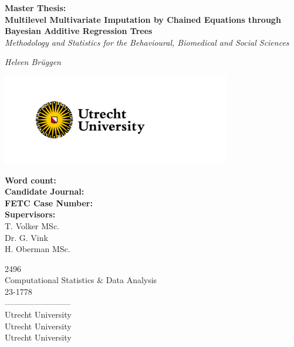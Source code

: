 \documentclass[10pt, a4paper, titlepage]{article}
\begin{document}
\begin{titlingpage}
\begin{center}
\Huge\textbf{Master Thesis:  \\ Multilevel Multivariate Imputation by Chained Equations through Bayesian Additive Regression Trees} \\
\Large\textit{Methodology and Statistics for the Behavioural, Biomedical and Social Sciences}

\vspace{.5cm}

\normalsize\textit{Heleen Brüggen}

\vspace{11.5cm}

\begin{minipage}{.5\textwidth}
\begin{center}
        \includegraphics[width=10cm]{graphs/UU_logo_2021_EN_RGB.png}
\end{center}
\end{minipage}%

\vspace{.25cm}

\begin{minipage}{0.5\textwidth}
\begin{flushleft}

\textbf{Word count:} \\
\textbf{Candidate Journal:} \\
\textbf{FETC Case Number:} \\
\textbf{Supervisors:} \\
T. Volker MSc. \\
Dr. G. Vink \\
H. Oberman MSc.
\end{flushleft}
\end{minipage}%
\begin{minipage}{0.5\textwidth}
\begin{flushright}

2496 \\ %
Computational Statistics \& Data Analysis \\
23-1778 \\
------------------------\\
Utrecht University \\
Utrecht University \\
Utrecht University
\end{flushright}
\end{minipage}

\end{center}
\end{titlingpage}
\end{document}
